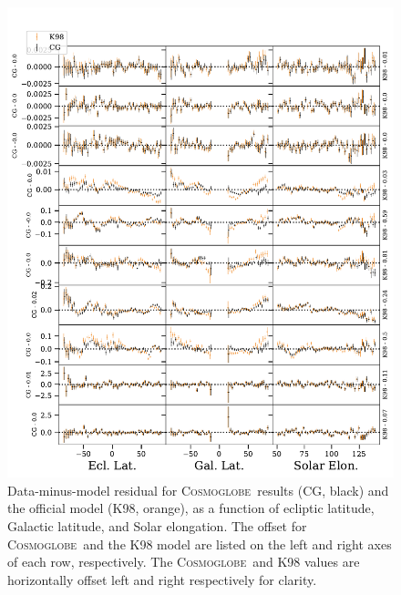 \documentclass{aa}
\def\cosmoglobe{\textsc{Cosmoglobe}}
\begin{document}
\begin{figure}
    \centering
	 \includegraphics[width=0.8\linewidth]{figs/tod_zodi_residuals.pdf}
	\caption{Data-minus-model residual for \cosmoglobe\ results (CG, black) and the official \cite{K98} model (K98, orange), as a function of ecliptic latitude, Galactic latitude, and Solar elongation. The offset for \cosmoglobe\ and the K98 model are listed on the left and right axes of each row, respectively. The \cosmoglobe\ and K98 values are horizontally offset left and right respectively for clarity.}
      \label{fig: zodi_timestream}
  \end{figure}
\end{document}

